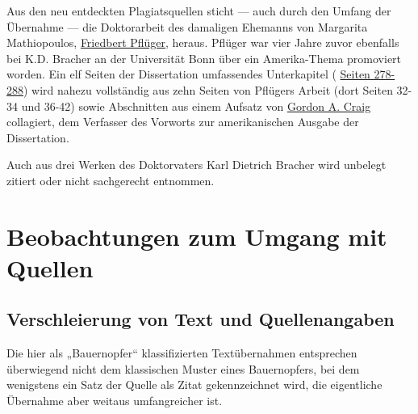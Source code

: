 \documentclass[ngerman,final,fontsize=12pt,paper=a4,twoside,bibliography=totoc,BCOR=8mm,draft=false]{scrartcl}
\begin{document}
Aus den neu entdeckten Plagiatsquellen sticht --- auch durch den Umfang der Übernahme --- die Doktorarbeit des damaligen Ehemanns von Margarita Mathiopoulos, %
\href{http://de.vroniplag.wikia.com/wiki/Kategorie:Pfl\%C3\%BCger_1983}{Friedbert Pflüger}, heraus. Pflüger war vier Jahre zuvor ebenfalls bei K.D. Bracher an der Universität Bonn über ein Amerika-Thema promoviert worden. Ein elf Seiten der Dissertation umfassendes Unterkapitel (%
\href{http://de.vroniplag.wikia.com/wiki/Mm/Mathiopoulos-1987/278}{Seiten 278-288}) wird nahezu vollständig aus zehn Seiten von Pflügers Arbeit (dort Seiten 32-34 und 36-42) sowie Abschnitten aus einem Aufsatz von %
\href{http://de.vroniplag.wikia.com/wiki/Kategorie:Craig_1984}{Gordon A. Craig} collagiert, dem Verfasser des Vorworts zur amerikanischen Ausgabe der Dissertation. 


Auch aus drei Werken des Doktorvaters Karl Dietrich Bracher wird unbelegt zitiert oder nicht sachgerecht entnommen. 

\section{%
Beobachtungen zum Umgang mit Quellen}
\subsection{%
Verschleierung von Text und Quellenangaben}

Die hier als „Bauernopfer“ klassifizierten Textübernahmen entsprechen überwiegend nicht dem klassischen Muster eines Bauernopfers, bei dem wenigstens ein Satz der Quelle als Zitat gekennzeichnet wird, die eigentliche Übernahme aber weitaus umfangreicher ist. 

\end{document}
